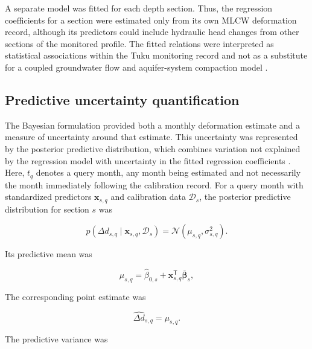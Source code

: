 A separate model was fitted for each depth section. Thus, the regression coefficients for a section were estimated only from its own MLCW deformation record, although its predictors could include hydraulic head changes from other sections of the monitored profile. The fitted relations were interpreted as statistical associations within the Tuku monitoring record and not as a substitute for a coupled groundwater flow and aquifer-system compaction model \citep{galloway_review_2011, burbey_extensometer_2020}.

\subsection{Predictive uncertainty quantification}
\label{subsec:predictive_uncertainty}

The Bayesian formulation provided both a monthly deformation estimate and a measure of uncertainty around that estimate. This uncertainty was represented by the posterior predictive distribution, which combines variation not explained by the regression model with uncertainty in the fitted regression coefficients \citep{mackay_bayesian_1992, bishop_pattern_2006, gelman_bayesian_2013}. Here, $t_q$ denotes a query month, any month being estimated and not necessarily the month immediately following the calibration record. For a query month with standardized predictors $\boldsymbol{x}_{s,q}$ and calibration data $\mathcal{D}_s$, the posterior predictive distribution for section $s$ was

\begin{equation}
p
\left(
\Delta d_{s,q}
\mid
\boldsymbol{x}_{s,q},
\mathcal{D}_s
\right)
=
\mathcal{N}
\left(
\mu_{s,q},
\sigma_{s,q}^{2}
\right).
\label{eq:posterior_predictive}
\end{equation}

Its predictive mean was

\begin{equation}
\mu_{s,q}
=
\widehat{\beta}_{0,s}
+
\boldsymbol{x}_{s,q}^{\mathsf{T}}
\overline{\boldsymbol{\beta}}_s,
\label{eq:predictive_mean}
\end{equation}

The corresponding point estimate was

\begin{equation}
\widehat{\Delta d}_{s,q}
=
\mu_{s,q}.
\label{eq:monthly_deformation_estimate}
\end{equation}

The predictive variance was

